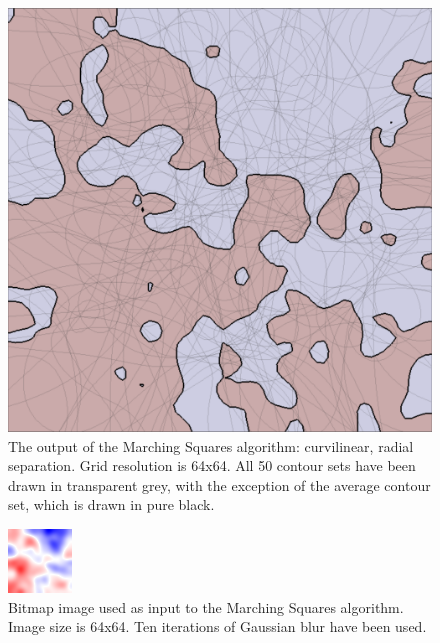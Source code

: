 \documentclass[12pt]{article}
\begin{document}
\begin{figure} 
\centering
  \includegraphics[width = 3 in]{1blur.png}
  \caption{The output of the Marching Squares algorithm: curvilinear, radial separation. 
Grid resolution is 64x64.
All 50 contour sets have been drawn in transparent grey, with the exception of the average contour set, which is drawn in pure black.
}
\end{figure}







\begin{figure} 
\centering
  \includegraphics[width = 3 in]{image_avg_10blur.png}
  \caption{Bitmap image used as input to the Marching Squares algorithm.
Image size is 64x64.
Ten iterations of Gaussian blur have been used.
}
\end{figure}
	
\end{document}
